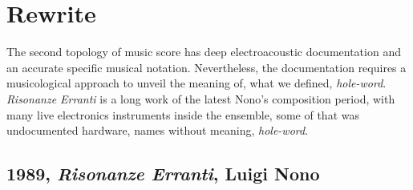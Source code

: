 \documentclass[twoside,a4paper]{article}
\begin{document}

\section{Rewrite}
\label{sec:rewriting}

The second topology of music score has deep electroacoustic documentation and an
accurate specific musical notation. Nevertheless, the documentation requires a
musicological approach to unveil the meaning of, what we defined, \emph{hole-word}.
\emph{Risonanze Erranti} is a long work of the latest Nono's composition period,
with many live electronics instruments inside the ensemble, some of that was
undocumented hardware, names without meaning, \emph{hole-word}.


\subsection{1989, \emph{Risonanze Erranti}, Luigi Nono}
\end{document}
